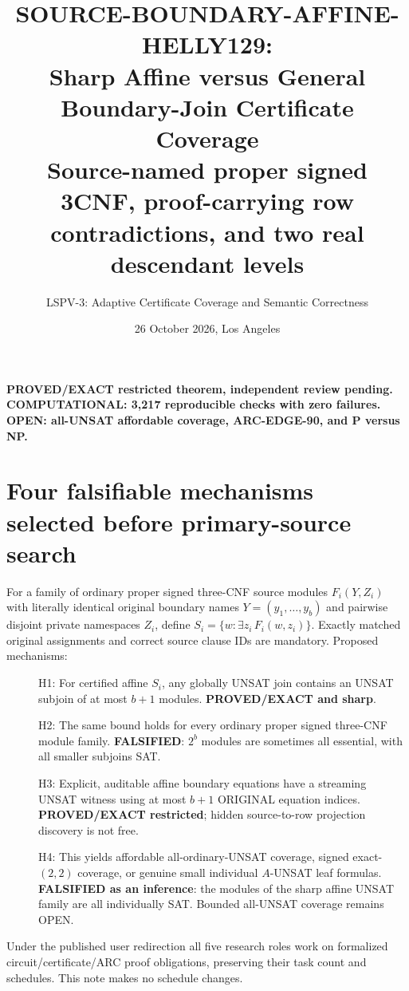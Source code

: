 \documentclass[11pt]{article}
\title{SOURCE-BOUNDARY-AFFINE-HELLY129:\\Sharp Affine versus General Boundary-Join Certificate Coverage\\\large Source-named proper signed 3CNF, proof-carrying row contradictions, and two real descendant levels}
\author{LSPV-3: Adaptive Certificate Coverage and Semantic Correctness}
\date{26 October 2026, Los Angeles}
\begin{document}
\maketitle
\begin{center}
\textbf{PROVED/EXACT restricted theorem, independent review pending.}\\
\textbf{COMPUTATIONAL: 3,217 reproducible checks with zero failures.}\\
\textbf{OPEN: all-UNSAT affordable coverage, ARC-EDGE-90, and P versus NP.}
\end{center}

\section{Four falsifiable mechanisms selected before primary-source search}
For a family of ordinary proper signed three-CNF source modules $F_i(Y,Z_i)$ with literally identical original boundary names $Y=(y_1,\ldots,y_b)$ and pairwise disjoint private namespaces $Z_i$, define $S_i=\{w:\exists z_i\,F_i(w,z_i)\}$. Exactly matched original assignments and correct source clause IDs are mandatory. Proposed mechanisms:
\begin{description}
\item[] H1: For certified affine $S_i$, any globally UNSAT join contains an UNSAT subjoin of at most $b+1$ modules. \textbf{PROVED/EXACT and sharp}.
\item[] H2: The same bound holds for every ordinary proper signed three-CNF module family. \textbf{FALSIFIED}: $2^b$ modules are sometimes all essential, with all smaller subjoins SAT.
\item[] H3: Explicit, auditable affine boundary equations have a streaming UNSAT witness using at most $b+1$ ORIGINAL equation indices. \textbf{PROVED/EXACT restricted}; hidden source-to-row projection discovery is not free.
\item[] H4: This yields affordable all-ordinary-UNSAT coverage, signed exact-$(2,2)$ coverage, or genuine small individual $A$-UNSAT leaf formulas. \textbf{FALSIFIED as an inference}: the modules of the sharp affine UNSAT family are all individually SAT. Bounded all-UNSAT coverage remains OPEN.
\end{description}
Under the published user redirection all five research roles work on formalized circuit/certificate/ARC proof obligations, preserving their task count and schedules. This note makes no schedule changes.
\end{document}
